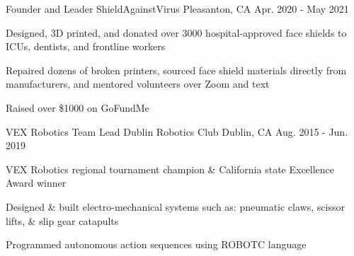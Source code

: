 \begin{cventries}







\cventry
{Founder and Leader} %
{ShieldAgainstVirus} %
{Pleasanton, CA} %
{Apr. 2020 - May 2021} %
{ %
\begin{cvitems}
\item {Designed, 3D printed, and donated over 3000 hospital-approved face shields to ICUs, dentists, and frontline workers}
\item {Repaired dozens of broken printers, sourced face shield materials directly from\\ manufacturers, and mentored volunteers over Zoom and text}
\item {Raised over \$1000 on GoFundMe}
\end{cvitems}
}




 \cventry
 {VEX Robotics Team Lead} %
 {Dublin Robotics Club} %
 {Dublin, CA} %
 {Aug. 2015 - Jun. 2019} %
 { %
 \begin{cvitems}
 \item {VEX Robotics regional tournament champion \& California state Excellence Award winner}
 \item {Designed \& built electro-mechanical systems such as: pneumatic claws, scissor lifts, \& slip gear catapults}
 \item {Programmed autonomous action sequences using ROBOTC language}
 \end{cvitems}
 }


\end{cventries}

